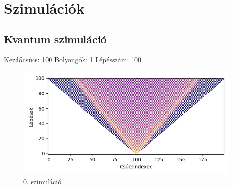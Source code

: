 \documentclass[14pt,a4paper]{article}
\begin{document}
\section{Szimulációk}
\subsection{Kvantum szimuláció}
Kezdőcsúcs: 100
Bolyongók: 1
Lépésszám: 100
\begin{figure}[H]
\centering
\includegraphics[width = 0.7\columnwidth]{sim00.jpg}
\caption{0. szimuláció}
\end{figure}
\end{document}
